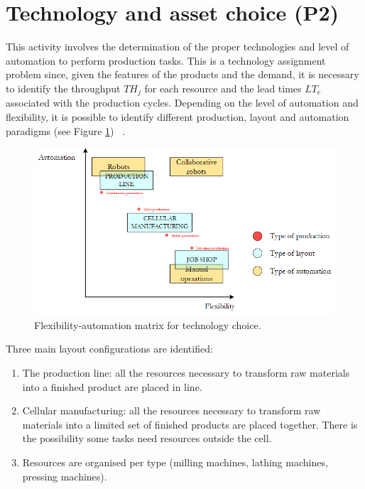 \section{Technology and asset choice (P2)}
This activity involves the determination of the proper technologies and level of automation to perform production tasks. This is a technology assignment problem  since, given the features of the products and the demand, it is necessary to identify the throughput $TH_j$ for each resource and the lead times $LT_e$ associated with the production cycles. Depending on the level of automation and flexibility, it is possible to identify different production, layout and automation paradigms (see Figure \ref{fig_prod_flexauto1}) ~\cite{Groover2015}.


\begin{figure}[hbt!]
\centering
\includegraphics[width=1.0\textwidth]{sectionProduction/design_plant_figures/fig_prod_flexauto1.png}
\captionsetup{type=figure}
\caption{Flexibility-automation matrix for technology choice.}
\label{fig_prod_flexauto1}
\end{figure}

Three main layout configurations are identified:

\begin{enumerate}
    \item The production line: all the resources necessary to transform raw materials into a finished product are placed in line.
    \item Cellular manufacturing: all the resources necessary to transform raw materials into a limited set of finished products are placed together. There is the possibility some tasks need resources outside the cell.
    \item Resources are organised per type (milling machines, lathing machines, pressing machines).

\end{enumerate}

